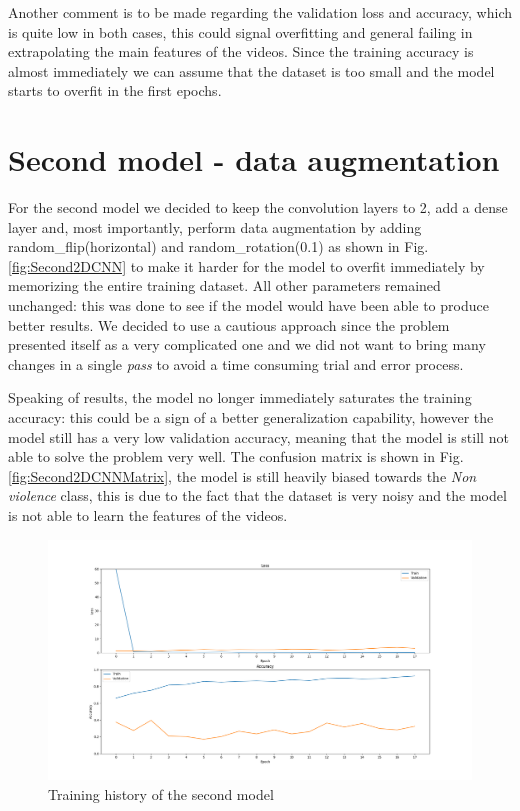 Another comment is to be made regarding the validation loss and accuracy, which is quite low in both cases, this could signal overfitting and general failing in extrapolating the main features of the videos. Since the training accuracy is almost immediately we can assume that the dataset is too small and the model starts to overfit in the first epochs.


\section{Second model - data augmentation}
For the second model we decided to keep the convolution layers to 2, add a dense layer and, most importantly, perform data augmentation by adding random\_flip(horizontal) and random\_rotation(0.1)  as shown in Fig. \ref{fig:Second2DCNN} to make it harder for the model to overfit immediately by memorizing the entire training dataset. All other parameters remained unchanged: this was done to see if the model would have been able to produce better results. 
We decided to use a cautious approach since the problem presented itself as a very complicated one and we did not want to bring many changes in a single \textit{pass} to avoid a time consuming trial and error process. 

Speaking of results, the model no longer immediately saturates the training accuracy: this could be a sign of a better generalization capability, however the model still has a very low validation accuracy,  meaning that the model is still not able to solve the problem very well. The confusion matrix is shown in Fig. \ref{fig:Second2DCNNMatrix}, the model is still heavily biased towards the \textit{Non violence} class, this is due to the fact that the dataset is very noisy and the model is not able to learn the features of the videos.

\begin{figure}[]
    \centering
    \includegraphics[width=1\textwidth]{images/731a-simple4augnozoom-b538-history.png}
    \caption{Training history of the second model}
    \label{fig:Second2DCNNHistory}
\end{figure}

